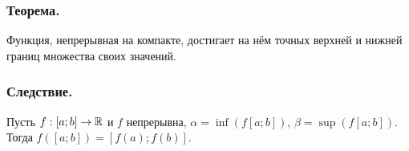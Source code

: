 \subsubsection{Теорема.}

Функция, непрерывная на компакте, достигает на нём точных верхней и нижней границ множества своих значений.

\subsubsection{Следствие.}

Пусть $f:[a;b]\to\mathbb{R}$ и $f$ непрерывна, $\alpha=\inf(f[a;b])$, $\beta=\sup(f[a;b])$.
Тогда $f([a;b])=[f(a);f(b)]$.



